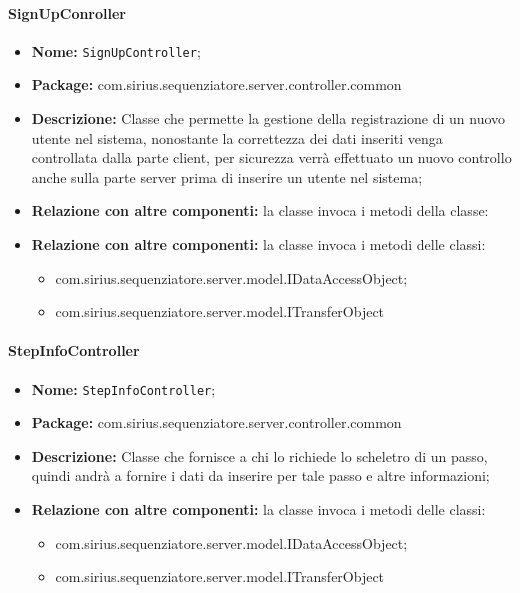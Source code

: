 \paragraph{SignUpConroller}
	\begin{itemize}
		\item \textbf{Nome:} \texttt{SignUpController};
		\item \textbf{Package:} com.sirius.sequenziatore.server.controller.common
		\item \textbf{Descrizione:} Classe che permette la gestione della registrazione di un nuovo utente nel sistema, nonostante la correttezza dei dati inseriti venga controllata dalla parte client, per sicurezza verrà effettuato un nuovo controllo anche sulla parte server prima di inserire un utente nel sistema;
		\item \textbf{Relazione con altre componenti:} la classe invoca i metodi della classe:
		\item \textbf{Relazione con altre componenti:} la classe invoca i metodi delle classi:
		\begin{itemize}
			\item com.sirius.sequenziatore.server.model.IDataAccessObject;
			\item com.sirius.sequenziatore.server.model.ITransferObject
		\end{itemize}
	\end{itemize}
	
\paragraph{StepInfoController}
	\begin{itemize}
		\item \textbf{Nome:} \texttt{StepInfoController};
		\item \textbf{Package:} com.sirius.sequenziatore.server.controller.common
		\item \textbf{Descrizione:} Classe che fornisce a chi lo richiede lo scheletro di un passo, quindi andrà a fornire i dati da inserire per tale passo e altre informazioni;
		\item \textbf{Relazione con altre componenti:} la classe invoca i metodi delle classi:
		\begin{itemize}
			\item com.sirius.sequenziatore.server.model.IDataAccessObject;
			\item com.sirius.sequenziatore.server.model.ITransferObject
		\end{itemize}
	\end{itemize}
